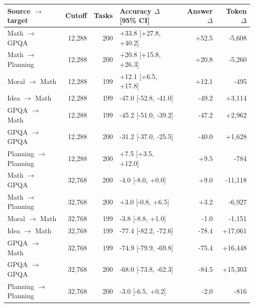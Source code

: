 \begin{tabular}{lrrlrr}
\toprule Source $\to$ target & Cutoff & Tasks & Accuracy $\Delta$ [95\% CI] & Answer $\Delta$ & Token $\Delta$ \\
\midrule
Math $\to$ GPQA & 12,288 & 200 & +33.8 [+27.8, +40.2] & +52.5 & -5,608 \\
Math $\to$ Planning & 12,288 & 200 & +20.8 [+15.8, +26.3] & +20.8 & -5,260 \\
Moral $\to$ Math & 12,288 & 199 & +12.1 [+6.5, +17.8] & +12.1 & -495 \\
Idea $\to$ Math & 12,288 & 199 & -47.0 [-52.8, -41.0] & -49.2 & +3,114 \\
GPQA $\to$ Math & 12,288 & 199 & -45.2 [-51.0, -39.2] & -47.2 & +2,962 \\
GPQA $\to$ GPQA & 12,288 & 200 & -31.2 [-37.0, -25.5] & -40.0 & +1,628 \\
Planning $\to$ Planning & 12,288 & 200 & +7.5 [+3.5, +12.0] & +9.5 & -784 \\
Math $\to$ GPQA & 32,768 & 200 & -4.0 [-8.0, +0.0] & +9.0 & -11,118 \\
Math $\to$ Planning & 32,768 & 200 & +3.0 [-0.8, +6.5] & +3.2 & -6,927 \\
Moral $\to$ Math & 32,768 & 199 & -3.8 [-8.8, +1.0] & -1.0 & -1,151 \\
Idea $\to$ Math & 32,768 & 199 & -77.4 [-82.2, -72.6] & -78.4 & +17,061 \\
GPQA $\to$ Math & 32,768 & 199 & -74.9 [-79.9, -69.8] & -75.4 & +16,448 \\
GPQA $\to$ GPQA & 32,768 & 200 & -68.0 [-73.8, -62.3] & -84.5 & +15,303 \\
Planning $\to$ Planning & 32,768 & 200 & -3.0 [-6.5, +0.2] & -2.0 & -816 \\
\bottomrule
\end{tabular}
